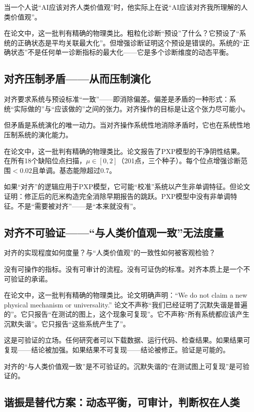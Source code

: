 \documentclass[11pt,a4paper]{book}
\theoremstyle{definition}
\begin{document}
当一个人说“AI应该对齐人类价值观”时，他实际上在说“AI应该对齐我所理解的人类价值观”。

在论文中，这一批判有精确的物理类比。粗粒化诊断“预设”了什么？它预设了“系统的正确状态是平均关联最大化”。但增强诊断证明这个预设是错误的。系统的“正确状态”不是任何单一诊断指标的最大化——它是多个诊断维度的动态平衡。

\subsection{对齐压制矛盾——从而压制演化}

对齐要求系统与预设标准“一致”——即消除偏差。偏差是矛盾的一种形式：系统“实际做的”与“应该做的”之间的张力。对齐操作的目标是让这个张力尽可能小。

但矛盾是系统演化的唯一动力。当对齐操作系统性地消除矛盾时，它也在系统性地压制系统的演化能力。

在论文中，这一批判有精确的物理类比。论文报告了PXP模型的干净阴性结果。在所有18个缺陷位点扫描，$\mu\in[0,2]$（201点，三个种子）。每个位点增强诊断范围$<0.02$且单调。基态能隙超过$0.7$。

如果“对齐”的逻辑应用于PXP模型，它可能“校准”系统以产生非单调特征。但论文证明：修正后的厄米构造完全消除早期报告的跳跃。PXP模型中没有非单调特征。不是“需要被对齐”——是“本来就没有”。

\subsection{对齐不可验证——“与人类价值观一致”无法度量}

对齐的实现程度如何度量？与“人类价值观”的一致性如何被客观检验？

没有可操作的指标。没有可审计的流程。没有可证伪的标准。对齐本质上是一个不可验证的承诺。

在论文中，这一批判有精确的物理类比。论文明确声明：“We do not claim a new physical mechanism or universality.” 论文不声称“我们已经证明了沉默失谐是普遍的”。它只报告“在测试的图上，这个现象可复现”。它不声称“所有系统都应该产生沉默失谐”。它只报告“这些系统产生了”。

这是可验证的立场。任何研究者可以下载数据、运行代码、检查结果。如果结果可复现——结论被加强。如果结果不可复现——结论被修正。验证是可能的。

对齐的“与人类价值观一致”是不可验证的。沉默失谐的“在测试图上可复现”是可验证的。

\subsection{谐振是替代方案：动态平衡，可审计，判断权在人类}
\end{document}
